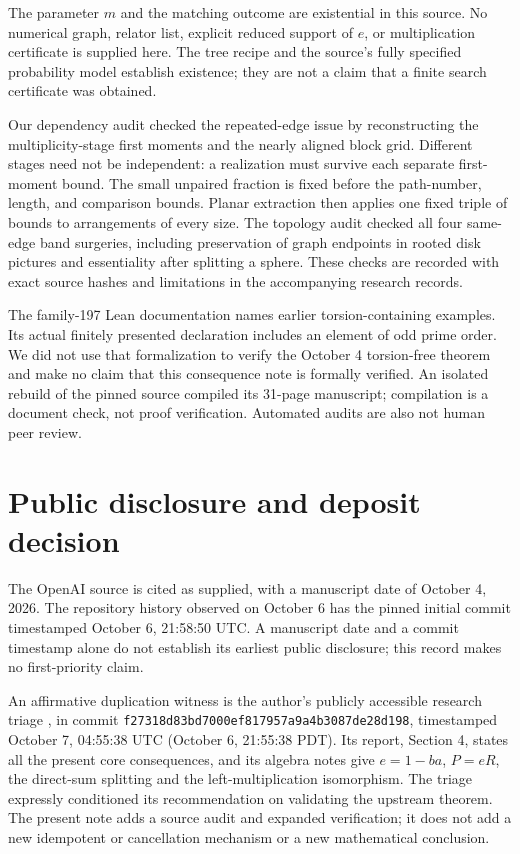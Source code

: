 \documentclass[11pt]{article}
\begin{document}
The parameter $m$ and the matching outcome are existential in this
source. No numerical graph, relator list, explicit reduced support of
$e$, or multiplication certificate is supplied here. The tree recipe
and the source's fully specified probability model establish existence;
they are not a claim that a finite search certificate was obtained.

Our dependency audit checked the repeated-edge issue by reconstructing
the multiplicity-stage first moments and the nearly aligned block grid.
Different stages need not be independent: a realization must survive
each separate first-moment bound. The small unpaired fraction is fixed
before the path-number, length, and comparison bounds. Planar extraction
then applies one fixed triple of bounds to arrangements of every size.
The topology audit checked all four same-edge band surgeries, including
preservation of graph endpoints in rooted disk pictures and essentiality
after splitting a sphere. These checks are recorded with exact source
hashes and limitations in the accompanying research records.

The family-197 Lean documentation names earlier torsion-containing
examples. Its actual finitely presented declaration includes an element
of odd prime order. We did not use that formalization to verify the
October 4 torsion-free theorem and make no claim that this consequence
note is formally verified. An isolated rebuild of the pinned source
compiled its 31-page manuscript; compilation is a document check,
not proof verification. Automated audits are also not human peer review.

\section{Public disclosure and deposit decision}
The OpenAI source is cited as supplied, with a manuscript date of
October 4, 2026. The repository history observed on October 6 has the
pinned initial commit timestamped October 6, 21:58:50 UTC. A manuscript
date and a commit timestamp alone do not establish its earliest public
disclosure; this record makes no first-priority claim.

An affirmative duplication witness is the author's publicly accessible
research triage \cite{Triage}, in commit
\texttt{f27318d83bd7000ef817957a9a4b3087de28d198}, timestamped
October 7, 04:55:38 UTC (October 6, 21:55:38 PDT).
Its report, Section 4, states all the present core consequences, and its
algebra notes give $e=1-ba$, $P=eR$, the direct-sum splitting and the
left-multiplication isomorphism. The triage expressly conditioned its
recommendation on validating the upstream theorem. The present note
adds a source audit and expanded verification; it does not add a new
idempotent or cancellation mechanism or a new mathematical conclusion.
\end{document}
